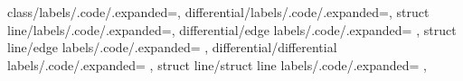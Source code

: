 {%
    class/labels/.code/.expanded={\unexpanded{}},
    differential/labels/.code/.expanded={\unexpanded{}},
    struct line/labels/.code/.expanded={\unexpanded{}},
%
    differential/edge labels/.code/.expanded=
        {\unexpanded{}},
    struct line/edge labels/.code/.expanded=
        {\unexpanded{}},
    differential/differential labels/.code/.expanded=
        {\unexpanded{}},
    struct line/struct line labels/.code/.expanded=
        {\unexpanded{}},
}

